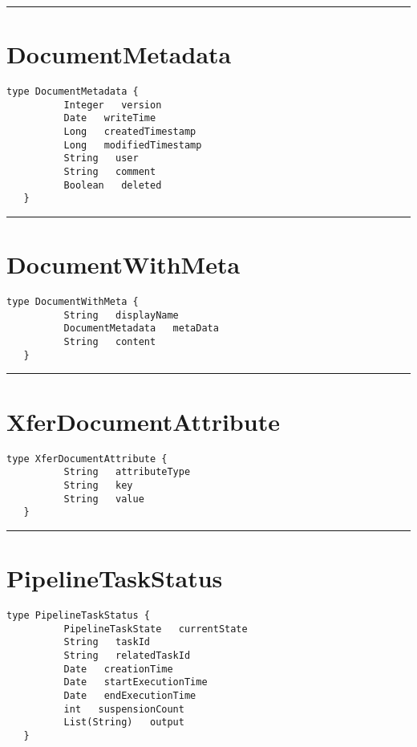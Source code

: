 \rule{12cm}{2pt}
\section{DocumentMetadata}
\label{type:DocumentMetadata}

\begin{lstlisting}[style=nonumbers]
   type DocumentMetadata {
          Integer   version
          Date   writeTime
          Long   createdTimestamp
          Long   modifiedTimestamp
          String   user
          String   comment
          Boolean   deleted
   }
\end{lstlisting}

\rule{12cm}{2pt}
\section{DocumentWithMeta}
\label{type:DocumentWithMeta}

\begin{lstlisting}[style=nonumbers]
   type DocumentWithMeta {
          String   displayName
          DocumentMetadata   metaData
          String   content
   }
\end{lstlisting}

\rule{12cm}{2pt}
\section{XferDocumentAttribute}
\label{type:XferDocumentAttribute}

\begin{lstlisting}[style=nonumbers]
   type XferDocumentAttribute {
          String   attributeType
          String   key
          String   value
   }
\end{lstlisting}

\rule{12cm}{2pt}
\section{PipelineTaskStatus}
\label{type:PipelineTaskStatus}

\begin{lstlisting}[style=nonumbers]
   type PipelineTaskStatus {
          PipelineTaskState   currentState
          String   taskId
          String   relatedTaskId
          Date   creationTime
          Date   startExecutionTime
          Date   endExecutionTime
          int   suspensionCount
          List(String)   output
   }
\end{lstlisting}

